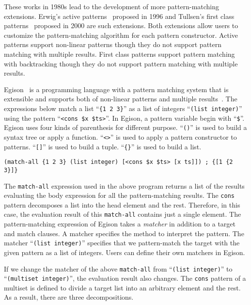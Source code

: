 \documentclass[acmlarge]{acmart}
\newcommand{\new}[1]{\textcolor{blue}{#1}}
\begin{document}
These works in 1980s lead to the development of more pattern-matching extensions.
Erwig's active patterns~\cite{erwig1996active} proposed in 1996 and Tullsen's first class patterns~\cite{tullsen2000first} proposed in 2000 are such extensions.
Both extensions allow users to customize the pattern-matching algorithm for each pattern constructor.
Active patterns support non-linear patterns though they do not support pattern matching with multiple results.
First class patterns support pattern matching with backtracking though they do not support pattern matching with multiple results.

Egison~\cite{egisonWeb} is a programming language with a pattern matching system that is extensible and supports both of non-linear patterns and multiple results~\cite{egi2018aplas}.
The expressions below match a list ``\texttt{\{1 2 3\}}'' as a list of integers ``\lstinline{(list integer)}'' using the pattern ``\lstinline{<cons $x $ts>}''.
In Egison, a pattern variable begin with ``\lstinline{$}''.
Egison uses four kinds of parenthesis for different purpose.
``\lstinline{()}'' is used to build a syntax tree or apply a function.
``\lstinline{<>}'' is used to apply a pattern constructor to patterns.
``\lstinline{[]}'' is used to build a tuple.
``\texttt{\{\}}'' is used to build a list. %

\begin{lstlisting}[language=egison]
(match-all {1 2 3} (list integer) [<cons $x $ts> [x ts]]) ; {[1 {2 3}]}
\end{lstlisting}

\noindent
The \lstinline{match-all} expression used in the above program returns a list of the results evaluating the body expression for all the pattern-matching results.
The \lstinline{cons} pattern decomposes a list into the head element and the rest.
Therefore, in this case, the evaluation result of this \lstinline{match-all} contains just a single element.
The pattern-matching expression of Egison takes a \emph{matcher} in addition to a target and match clauses.
A matcher specifies the method to interpret the pattern.
The matcher ``\lstinline{(list integer)}'' specifies that we pattern-match the target with the given pattern as a list of integers.
Users can define their own matchers in Egison.

If we change the matcher of the above \lstinline{match-all} from ``\lstinline{(list integer)}'' to ``\lstinline{(multiset integer)}'', the evaluation result also changes.
The \lstinline{cons} pattern of a multiset is defined to divide a target list into an arbitrary element and the rest.
As a result, there are three decompositions.
\end{document}
